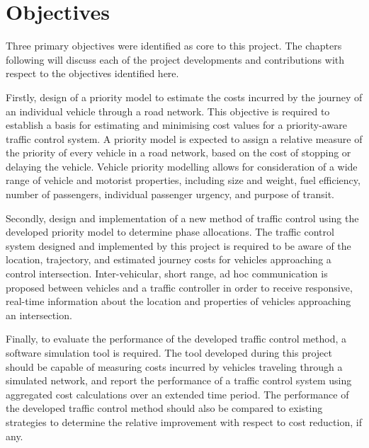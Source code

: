\section{Objectives}

Three primary objectives were identified as core to this project. The chapters following will discuss each of the project developments and contributions with respect to the objectives identified here.

Firstly, design of a priority model to estimate the costs incurred by the journey of an individual vehicle through a road network. This objective is required to establish a basis for estimating and minimising cost values for a priority-aware traffic control system. A priority model is expected to assign a relative measure of the priority of every vehicle in a road network, based on the cost of stopping or delaying the vehicle. Vehicle priority modelling allows for consideration of a wide range of vehicle and motorist properties, including size and weight, fuel efficiency, number of passengers, individual passenger urgency, and purpose of transit. 

Secondly, design and implementation of a new method of traffic control using the developed priority model to determine phase allocations. The traffic control system designed and implemented by this project is required to be aware of the location, trajectory, and estimated journey costs for vehicles approaching a control intersection. Inter-vehicular, short range, ad hoc communication is proposed between vehicles and a traffic controller in order to receive responsive, real-time information about the location and properties of vehicles approaching an intersection. 

Finally, to evaluate the performance of the developed traffic control method, a software simulation tool is required. The tool developed during this project should be capable of measuring costs incurred by vehicles traveling through a simulated network, and report the performance of a traffic control system using aggregated cost calculations over an extended time period. The performance of the developed traffic control method should also be compared to existing strategies to determine the relative improvement with respect to cost reduction, if any. 


